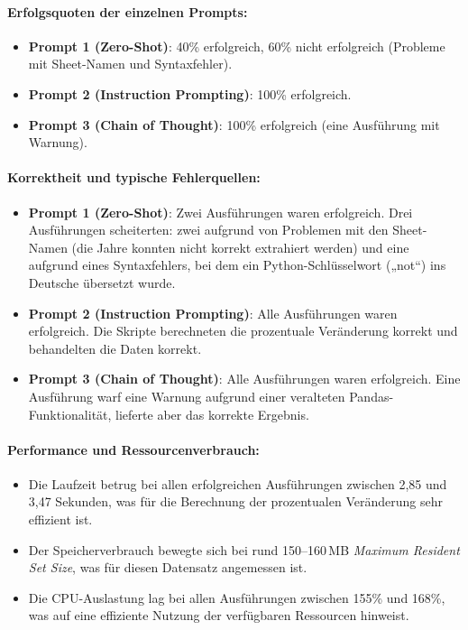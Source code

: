 \documentclass[11pt,a4paper]{article}
\begin{document}
\paragraph{Erfolgsquoten der einzelnen Prompts:}
\begin{itemize}
    \item \textbf{Prompt 1 (Zero-Shot)}: 40\% erfolgreich, 60\% nicht erfolgreich (Probleme mit Sheet-Namen und Syntaxfehler).
    \item \textbf{Prompt 2 (Instruction Prompting)}: 100\% erfolgreich.
    \item \textbf{Prompt 3 (Chain of Thought)}: 100\% erfolgreich (eine Ausführung mit Warnung).
\end{itemize}

\paragraph{Korrektheit und typische Fehlerquellen:}
\begin{itemize}
    \item \textbf{Prompt 1 (Zero-Shot)}: Zwei Ausführungen waren erfolgreich. Drei Ausführungen scheiterten: zwei aufgrund von Problemen mit den Sheet-Namen (die Jahre konnten nicht korrekt extrahiert werden) und eine aufgrund eines Syntaxfehlers, bei dem ein Python-Schlüsselwort („not“) ins Deutsche übersetzt wurde.
    \item \textbf{Prompt 2 (Instruction Prompting)}: Alle Ausführungen waren erfolgreich. Die Skripte berechneten die prozentuale Veränderung korrekt und behandelten die Daten korrekt.
    \item \textbf{Prompt 3 (Chain of Thought)}: Alle Ausführungen waren erfolgreich. Eine Ausführung warf eine Warnung aufgrund einer veralteten Pandas-Funktionalität, lieferte aber das korrekte Ergebnis.
\end{itemize}

\paragraph{Performance und Ressourcenverbrauch:}
\begin{itemize}
    \item Die Laufzeit betrug bei allen erfolgreichen Ausführungen zwischen 2,85 und 3,47 Sekunden, was für die Berechnung der prozentualen Veränderung sehr effizient ist.
    \item Der Speicherverbrauch bewegte sich bei rund 150--160\,MB \emph{Maximum Resident Set Size}, was für diesen Datensatz angemessen ist.
    \item Die CPU-Auslastung lag bei allen Ausführungen zwischen 155\% und 168\%, was auf eine effiziente Nutzung der verfügbaren Ressourcen hinweist.
\end{itemize}
\end{document}
